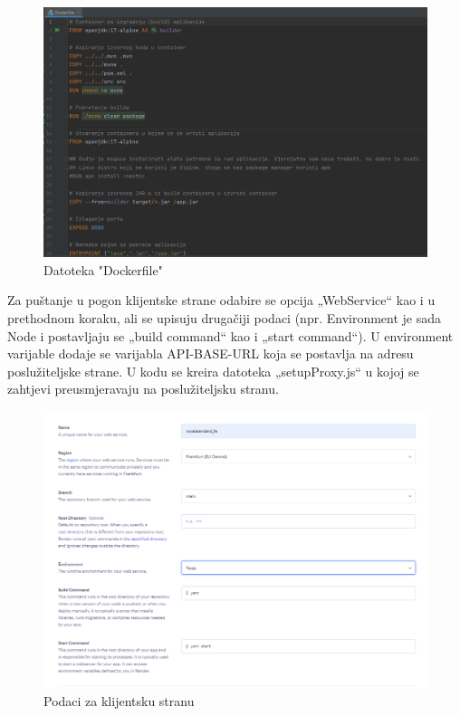 		\begin{figure}[H]
			\includegraphics[width=\textwidth]{slike/dockerfile.PNG} 
			\caption{Datoteka "Dockerfile"}
			\label{fig:Dockerfile}
		\end{figure}
		
		Za puštanje u pogon klijentske strane odabire se opcija „WebService“ kao i u prethodnom koraku, ali se upisuju drugačiji podaci (npr. Environment je sada Node i postavljaju se „build command“ kao i „start command“). U environment varijable dodaje se varijabla API-BASE-URL koja se postavlja na adresu poslužiteljske strane. U kodu se kreira datoteka „setupProxy.js“ u kojoj se zahtjevi preusmjeravaju na poslužiteljsku stranu.
			
		
		\begin{figure}[H]
			\includegraphics[width=\textwidth]{slike/osnovnipodacifrontend.PNG} 
			\caption{Podaci za klijentsku stranu}
			\label{fig:Podaci za klijentsku stranu}
		\end{figure}
		
